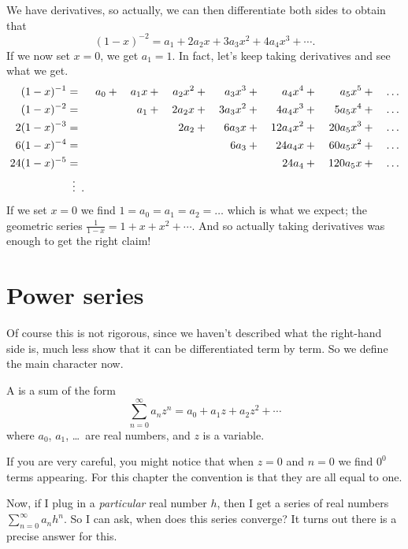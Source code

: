 We have derivatives, so actually,
we can then differentiate both sides to obtain that
\[ (1-x)^{-2} = a_1 + 2a_2 x + 3a_3 x^2 + 4a_4 x^3 + \cdots. \]
If we now set $x = 0$, we get $a_1 = 1$.
In fact, let's keep taking derivatives and see what we get.
\begin{alignat*}{8}
	(1-x)^{-1} &{}={}& a_0 &{}+{}& a_1x &{}+{}& a_2x^2 &{}+{}& a_3x^3 &{}+{}& a_4x^4  &{}+{}& a_5x^5 &{}+{}& \dots \\
	(1-x)^{-2} &{}={}& && a_1 &{}+{}& 2a_2 x &{}+{}& 3a_3 x^2 &{}+{}& 4a_4 x^3 &{}+{}& 5a_5 x^4 &{}+{}&\dots \\
	2(1-x)^{-3} &{}={}& && && 2a_2 &{}+{}& 6a_3 x &{}+{}& 12 a_4 x^2 &{}+{}& 20 a_5 x^3 &{}+{}&  \dots \\
	6(1-x)^{-4} &{}={}& &&  &&&& 6a_3 &{}+{}& 24 a_4 x &{}+{}& 60 a_5 x^2 &{}+{}& \dots \\
	24(1-x)^{-5} &{}={}& && && && && 24 a_4 &{}+{}& 120 a_5 x &{}+{}& \dots \\
	&{}\vdotswithin={}.
\end{alignat*}
If we set $x=0$ we find $1 = a_0 = a_1 = a_2 = \dots$
which is what we expect;
the geometric series $\frac{1}{1-x} = 1 + x + x^2 + \cdots$.
And so actually taking derivatives was enough to get the right claim!

\section{Power series}
Of course this is not rigorous,
since we haven't described what the right-hand side is,
much less show that it can be differentiated term by term.
So we define the main character now.

\begin{definition}
	A  is a sum of the form
	\[ \sum_{n = 0}^\infty a_n z^n
		= a_0 + a_1 z + a_2 z^2 + \cdots \]
	where $a_0$, $a_1$, \dots\ are real numbers,
	and $z$ is a variable.
\end{definition}
\begin{abuse}
	[$0^0=1$]
	If you are very careful, you might notice
	that when $z=0$ and $n=0$ we find $0^0$ terms appearing.
	For this chapter the convention is that
	they are all equal to one.
\end{abuse}

Now, if I plug in a \emph{particular} real number $h$,
then I get a series of real numbers $\sum_{n = 0}^{\infty} a_n h^n$.
So I can ask, when does this series converge?
It turns out there is a precise answer for this.

